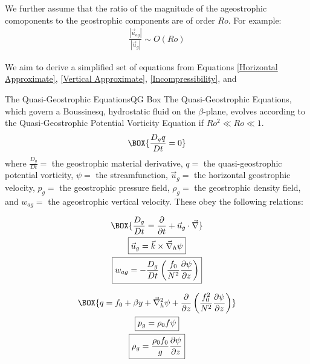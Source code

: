 We further assume that the ratio of the magnitude of the ageostrophic comoponents to the geostrophic components are of order \(Ro\). For example:
\begin{align*}
    \frac{\left|\vec{u}_{ag}\right|}{\left|\vec{u}_g\right|}\sim O (Ro)
\end{align*}

We aim to derive a simplified set of equations from Equations \ref{Horizontal Approximate}, \ref{Vertical Approximate}, \ref{Incompressibility}, and 

\begin{fact}{The Quasi-Geostrophic Equations}{QG Box}\label{QG Box}
    The Quasi-Geostrophic Equations, which govern a Boussinesq, hydrostatic fluid on the \(\beta\)-plane, evolves according to the Quasi-Geostrophic Potential Vorticity Equation if \(Ro^2\ll Ro \ll 1\).
    \begin{gather}
        \label{QGPV Cons}
        \BOX{
            \frac{D_g q}{Dt} = 0
        }
    \end{gather}
    where \(\frac{D_g}{Dt}=\) the geostrophic material derivative, \(q=\) the quasi-geostrophic potential vorticity, \(\psi=\) the streamfunction, \(\vec{u}_g=\) the horizontal geostrophic velocity, \(p_g=\) the geostrophic pressure field, \(\rho_g=\) the geostrophic density field, and \(w_{ag}=\) the ageostrophic vertical velocity. These obey the following relations:

    \begin{minipage}{0.42\linewidth}
        \begin{gather}
            \label{Geostrophic MD}
            \BOX{
                \frac{D_g}{Dt}=\frac{\partial }{\partial t}+ \vec{u}_g\cdot\vec{\nabla}
            }
            \\
            \label{Streamfct}
            \boxed{\vec{u}_g = \vec{k}\times\vec{\nabla}_h\psi}
            \\
            \label{wag}
            \boxed{w_{ag}=-\frac{D_g}{Dt}\left( \frac{f_0}{N^2} \frac{\partial \psi}{\partial z}\right)}
        \end{gather}
    \end{minipage}
    \hfill
    \begin{minipage}{0.56\linewidth}
        \begin{gather}
            \label{QGPV}
            \BOX{
                q=f_0+\beta y + \vec{\nabla}_h^2 \psi + \frac{\partial }{\partial z}\left( \frac{f_0^2}{N^2} \frac{\partial \psi}{\partial z} \right)
            }
            \\
            \label{p QGPV}
            \boxed{p_g = \rho_0 f \psi}
            \\
            \label{rho QGPV}
            \boxed{\rho_g = \frac{\rho_0 f_0}{g}\frac{\partial \psi}{\partial z}}
        \end{gather}
    \end{minipage}

\end{fact}

